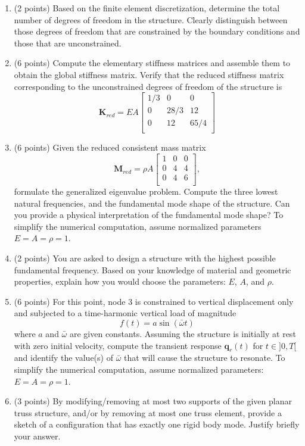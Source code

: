 \documentclass[12pt]{article}
\begin{document}
\begin{enumerate}
	\item[(a)] (2 points) Based on the finite element discretization, determine the total number of degrees of freedom in the structure. Clearly distinguish between those degrees of freedom that are constrained by the boundary conditions and those that are unconstrained.
	\item[(b)] (6 points) Compute the elementary stiffness matrices and assemble them to obtain the global stiffness matrix. Verify that the reduced stiffness matrix corresponding to the unconstrained degrees of freedom of the structure is
	      $$\mathbf K_{red}=EA\begin{bmatrix}
			      1/3 & 0    & 0    \\
			      0   & 28/3 & 12   \\
			      0   & 12   & 65/4 \\
		      \end{bmatrix}$$
	\item[(c)] (6 points) Given the reduced consistent mass matrix
	      $$\mathbf{M}_{red}=\rho A \begin{bmatrix}
			      1 & 0 & 0 \\
			      0 & 4 & 4 \\
			      0 & 4 & 6 \\
		      \end{bmatrix},$$
	      formulate the generalized eigenvalue problem. Compute the three lowest natural frequencies, and the fundamental mode shape of the structure. Can you provide a physical interpretation of the fundamental mode shape? To simplify the numerical computation, assume normalized parameters \( E = A = \rho = 1 \).
	\item[(d)] (2 points) You are asked to design a structure with the highest possible fundamental frequency. Based on your knowledge of material and geometric properties, explain how you would choose the parameters: $E$, $A$, and $\rho$.
	\item[(e)] (6 points)  For this point, node 3 is constrained to vertical displacement only and subjected to a time-harmonic vertical load of magnitude
	      \[
		      f(t) = a \sin(\bar\omega t)
	      \]
	      where \( a \) and \( \bar\omega \) are given constants. Assuming the structure is initially at rest with zero initial velocity, compute the transient response \( \mathbf{q}_r(t) \) for \( t\in]0,T[ \) and identify the value(s) of $\bar\omega$ that will cause the structure to resonate. To simplify the numerical computation, assume normalized parameters: \( E = A = \rho = 1 \).
	\item[(f)] (3 points) By modifying/removing at most two supports of the given planar truss structure, and/or by removing at most one truss element, provide a sketch of a configuration that has exactly one rigid body mode. Justify briefly your answer.
\end{enumerate}
\end{document}
